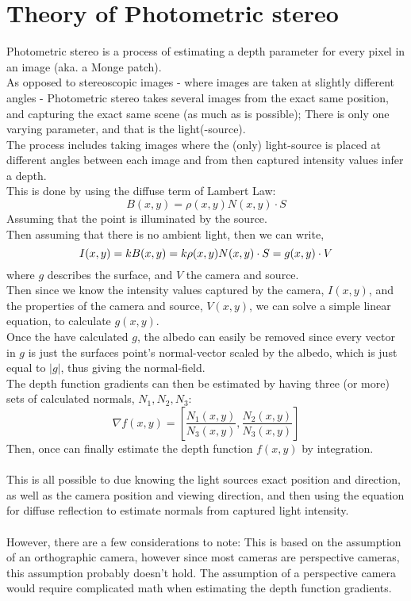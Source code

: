 \section{Theory of Photometric stereo}
Photometric stereo is a process of estimating a depth parameter for every pixel in an image (aka. a Monge patch).\\
As opposed to stereoscopic images - where images are taken at slightly different angles - Photometric stereo takes several images from the exact same position, and capturing the exact same scene (as much as is possible); There is only one varying parameter, and that is the light(-source).\\
The process includes taking images where the (only) light-source is placed at different angles between each image and from then captured intensity values infer a depth.\\
This is done by using the diffuse term of Lambert Law:
\begin{equation}
B(x,y) = \rho(x, y)N(x, y) \cdot S
\end{equation}
Assuming that the point is illuminated by the source.\\
Then assuming that there is no ambient light, then we can write,
\begin{equation}
I(x, y) = kB(x,y) = k\rho(x, y)N(x, y) \cdot S\\
= g(x, y) \cdot V
\end{equation}
where $g$ describes the surface, and $V$ the camera and source.\\
Then since we know the intensity values captured by the camera, $I(x,y)$, and the properties of the camera and source, $V(x,y)$, we can solve a simple linear equation, to calculate $g(x, y)$.\\
Once the have calculated $g$, the albedo can easily be removed since every vector in $g$ is just the surfaces point's normal-vector scaled by the albedo, which is just equal to $|g|$, thus giving the normal-field.\\
The depth function gradients can then be estimated by having three (or more) sets of calculated normals, $N_1, N_2, N_3$:
\begin{equation}
\nabla f(x, y) = [\frac{N_1(x, y)}{N_3(x, y)}, \frac{N_2(x, y)}{N_3(x, y)}]
\end{equation}
Then, once can finally estimate the depth function $f(x, y)$ by integration.\\
\\
This is all possible to due knowing the light sources exact position and direction, as well as the camera position and viewing direction, and then using the equation for diffuse reflection to estimate normals from captured light intensity.\\
\\
However, there are a few considerations to note: This is based on the assumption of an orthographic camera, however since most cameras are perspective cameras, this assumption probably doesn't hold. The assumption of a perspective camera would require complicated math when estimating the depth function gradients.